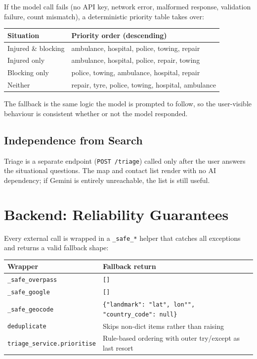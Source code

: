 \documentclass[11pt, a4paper]{article}
\newcommand{\code}[1]{\texttt{\small#1}}
\begin{document}
If the model call fails (no API key, network error, malformed response, validation failure, count mismatch), a deterministic priority table takes over:

\begin{tabularx}{\textwidth}{l X}
\toprule
\textbf{Situation} & \textbf{Priority order (descending)} \\
\midrule
Injured \& blocking & ambulance, hospital, police, towing, repair \\
Injured only & ambulance, hospital, police, repair, towing \\
Blocking only & police, towing, ambulance, hospital, repair \\
Neither & repair, tyre, police, towing, hospital, ambulance \\
\bottomrule
\end{tabularx}

The fallback is the same logic the model is prompted to follow, so the user-visible behaviour is consistent whether or not the model responded.

\subsection{Independence from Search}

Triage is a separate endpoint (\code{POST /triage}) called only after the user answers the situational questions. The map and contact list render with no AI dependency; if Gemini is entirely unreachable, the list is still useful.

\section{Backend: Reliability Guarantees}

Every external call is wrapped in a \code{\_safe\_*} helper that catches all exceptions and returns a valid fallback shape:

\begin{tabularx}{\textwidth}{l X}
\toprule
\textbf{Wrapper} & \textbf{Fallback return} \\
\midrule
\code{\_safe\_overpass} & \code{[]} \\
\code{\_safe\_google} & \code{[]} \\
\code{\_safe\_geocode} & \code{\{"landmark": "lat°, lon°", "country\_code": null\}} \\
\code{deduplicate} & Skips non-dict items rather than raising \\
\code{triage\_service.prioritise} & Rule-based ordering with outer try/except as last resort \\
\bottomrule
\end{tabularx}
\end{document}
